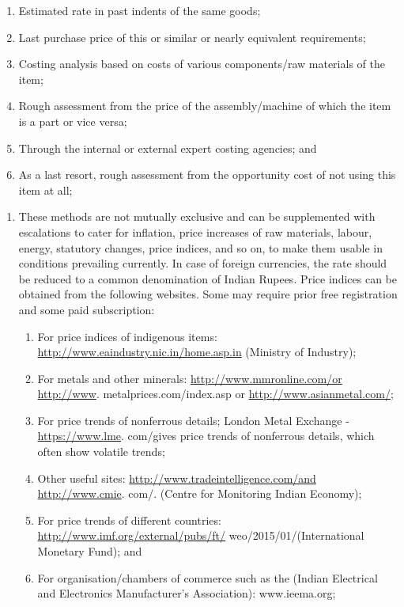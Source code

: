 \documentclass[
  10pt,
  twoside]{article}
\providecommand{\tightlist}{%
  \setlength{\itemsep}{0pt}\setlength{\parskip}{0pt}}
\begin{document}
\begin{enumerate}
  \begin{enumerate}
  \def\labelenumii{\alph{enumii})}
  \tightlist
  \item
    Estimated rate in past indents of the same goods;
  \item
    Last purchase price of this or similar or nearly equivalent
    requirements;
  \item
    Costing analysis based on costs of various components/raw materials
    of the item;
  \item
    Rough assessment from the price of the assembly/machine of which the
    item is a part or vice versa;
  \item
    Through the internal or external expert costing agencies; and
  \item
    As a last resort, rough assessment from the opportunity cost of not
    using this item at all;
  \end{enumerate}

  \begin{enumerate}
  \def\labelenumii{\roman{enumii})}
  \setcounter{enumii}{3}
  \item
    These methods are not mutually exclusive and can be supplemented
    with escalations to cater for inflation, price increases of raw
    materials, labour, energy, statutory changes, price indices, and so
    on, to make them usable in conditions prevailing currently. In case
    of foreign currencies, the rate should be reduced to a common
    denomination of Indian Rupees. Price indices can be obtained from
    the following websites. Some may require prior free registration and
    some paid subscription:

    \begin{enumerate}
    \def\labelenumiii{\alph{enumiii})}
    \tightlist
    \item
      For price indices of indigenous items:
      \url{http://www.eaindustry.nic.in/home.asp.in} (Ministry of
      Industry);
    \item
      For metals and other minerals: \url{http://www.mmronline.com/or}
      \url{http://www}. metalprices.com/index.asp or
      \url{http://www.asianmetal.com/};
    \item
      For price trends of nonferrous details; London Metal Exchange -
      \url{https://www.lme}. com/gives price trends of nonferrous
      details, which often show volatile trends;
    \item
      Other useful sites: \url{http://www.tradeintelligence.com/and}
      \url{http://www.cmie}. com/. (Centre for Monitoring Indian
      Economy);
    \item
      For price trends of different countries:
      \url{http://www.imf.org/external/pubs/ft/}
      weo/2015/01/(International Monetary Fund); and
    \item
      For organisation/chambers of commerce such as the (Indian
      Electrical and Electronics Manufacturer's Association):
      www.ieema.org;
    \end{enumerate}
  \end{enumerate}
\end{enumerate}
\end{document}
